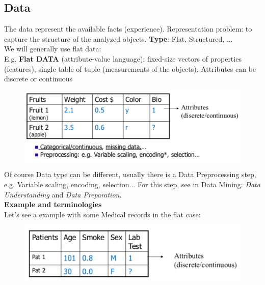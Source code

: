 \documentclass[../main.tex]{subfiles}
\begin{document}
\subsection{Data}
The data represent the available facts (experience). Representation problem: to capture the structure of the analyzed objects. \textbf{Type}: Flat, Structured, ...\\

\noindent We will generally use flat data:\\
 E.g. \textbf{Flat DATA} (attribute-value language): fixed-size vectors of properties (features), single table of tuple (measurements of the objects), Attributes can be discrete or continuous

\begin{figure}[H]
\centering
\includegraphics[scale=0.4]{lectures/1_Introduction/flat_data.png}
\end{figure}
 Of course Data type can be different, usually there is a Data Preprocessing step, e.g. Variable scaling, encoding, selection...
 For this step, see in Data Mining: \textit{Data Understanding} and \textit{Data Preparation}.\\

\noindent\textbf{Example and terminologies}\\
Let's see a example with some Medical records in the flat case: 

\begin{figure}[H]
\centering
\includegraphics[scale=0.4]{lectures/1_Introduction/flat_data_medical.png}
\end{figure}
\end{document}
